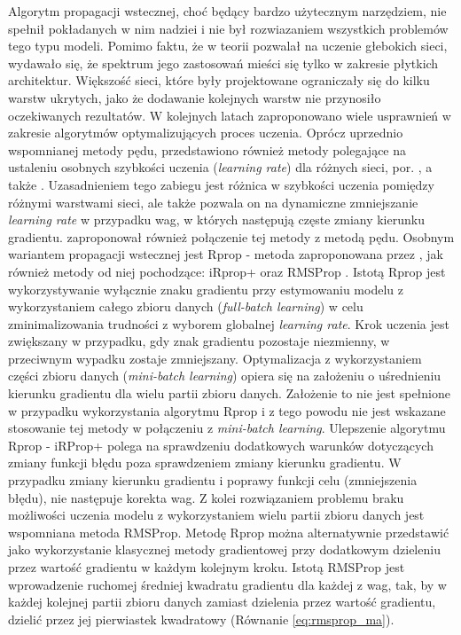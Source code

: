 \documentclass[12pt,a4paper,twoside]{article}
\begin{document}
Algorytm propagacji wstecznej, choć będący bardzo użytecznym narzędziem, nie spełnił pokładanych w nim nadziei i nie był rozwiazaniem wszystkich problemów tego typu modeli. Pomimo faktu, że w teorii pozwalał na uczenie głebokich sieci, wydawało się, że spektrum jego zastosowań mieści się tylko w zakresie płytkich architektur. Większość sieci, które były projektowane ograniczały się do kilku warstw ukrytych, jako że dodawanie kolejnych warstw nie przynosiło oczekiwanych rezultatów. W kolejnych latach zaproponowano wiele usprawnień w zakresie algorytmów optymalizujących proces uczenia. Oprócz uprzednio wspomnianej metody pędu, przedstawiono również metody polegające na ustaleniu osobnych szybkości uczenia (\textit{learning rate}) dla różnych sieci, por. \citet{jacobs1989}, a także \citet{almeida1990}. Uzasadnieniem tego zabiegu jest różnica w szybkości uczenia pomiędzy różnymi warstwami sieci, ale także pozwala on na dynamiczne zmniejszanie \textit{learning rate} w przypadku wag, w których następują częste zmiany kierunku gradientu. \citet{jacobs1989} zaproponował również połączenie tej metody z metodą pędu.
Osobnym wariantem propagacji wstecznej jest Rprop - metoda zaproponowana przez \citet{riedmiller1993}, jak również metody od niej pochodzące: iRprop+ \citep{igel2003} oraz RMSProp \citep{tieleman2012}. Istotą Rprop jest wykorzystywanie wyłącznie znaku gradientu przy estymowaniu modelu z wykorzystaniem całego zbioru danych (\textit{full-batch learning}) w celu zminimalizowania trudności z wyborem globalnej \textit{learning rate}. Krok uczenia jest zwiększany w przypadku, gdy znak gradientu pozostaje niezmienny, w przeciwnym wypadku zostaje zmniejszany. Optymalizacja z wykorzystaniem części zbioru danych (\textit{mini-batch learning}) opiera się na założeniu o uśrednieniu kierunku gradientu dla wielu partii zbioru danych. Założenie to nie jest spełnione w przypadku wykorzystania algorytmu Rprop i z tego powodu nie jest wskazane stosowanie tej metody w połączeniu z \textit{mini-batch learning}. Ulepszenie algorytmu Rprop - iRProp+ polega na sprawdzeniu dodatkowych warunków dotyczących zmiany funkcji błędu poza sprawdzeniem zmiany kierunku gradientu. W przypadku zmiany kierunku gradientu i poprawy funkcji celu (zmniejszenia błędu), nie następuje korekta wag. Z kolei rozwiązaniem problemu braku możliwości uczenia modelu z wykorzystaniem wielu partii zbioru danych jest wspomniana metoda RMSProp. Metodę Rprop można alternatywnie przedstawić jako wykorzystanie klasycznej metody gradientowej przy dodatkowym dzieleniu przez wartość gradientu w każdym kolejnym kroku.
Istotą RMSProp jest wprowadzenie ruchomej średniej kwadratu gradientu dla każdej z wag, tak, by w każdej kolejnej partii zbioru danych zamiast dzielenia przez wartość gradientu, dzielić przez jej pierwiastek kwadratowy (Równanie \ref{eq:rmsprop_ma}).
\end{document}
